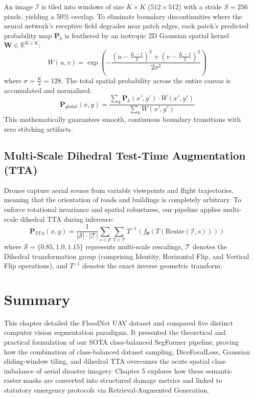 An image $\mathcal{I}$ is tiled into windows of size $K \times K$ ($512 \times 512$) with a stride $S = 256$ pixels, yielding a 50\% overlap. To eliminate boundary discontinuities where the neural network's receptive field degrades near patch edges, each patch's predicted probability map $\mathbf{P}_k$ is feathered by an isotropic 2D Gaussian spatial kernel $\mathbf{W} \in \mathbb{R}^{K \times K}$:
\begin{equation}
    W(u, v) = \exp\left( -\frac{(u - \frac{K-1}{2})^2 + (v - \frac{K-1}{2})^2}{2\sigma^2} \right)
\end{equation}
where $\sigma = \frac{K}{4} = 128$. The total spatial probability across the entire canvas is accumulated and normalized:
\begin{equation}
    \mathbf{P}_{global}(x, y) = \frac{\sum_{k} \mathbf{P}_k(x', y') \cdot W(x', y')}{\sum_{k} W(x', y')}
\end{equation}
This mathematically guarantees smooth, continuous boundary transitions with zero stitching artifacts.

\subsection{Multi-Scale Dihedral Test-Time Augmentation (TTA)}
Drones capture aerial scenes from variable viewpoints and flight trajectories, meaning that the orientation of roads and buildings is completely arbitrary. To enforce rotational invariance and spatial robustness, our pipeline applies multi-scale dihedral TTA during inference:
\begin{equation}
    \mathbf{P}_{TTA}(x, y) = \frac{1}{|\mathcal{S}| \cdot |\mathcal{T}|} \sum_{s \in \mathcal{S}} \sum_{T \in \mathcal{T}} T^{-1}\left( f_{\boldsymbol{\theta}}\left( T(\text{Resize}(\mathcal{I}, s)) \right) \right)
\end{equation}
where $\mathcal{S} = \{0.85, 1.0, 1.15\}$ represents multi-scale rescalings, $\mathcal{T}$ denotes the Dihedral transformation group (comprising Identity, Horizontal Flip, and Vertical Flip operations), and $T^{-1}$ denotes the exact inverse geometric transform.

\section{Summary}
This chapter detailed the FloodNet UAV dataset and compared five distinct computer vision segmentation paradigms. It presented the theoretical and practical formulation of our SOTA class-balanced SegFormer pipeline, proving how the combination of class-balanced dataset sampling, DiceFocalLoss, Gaussian sliding-window tiling, and dihedral TTA overcomes the acute spatial class imbalance of aerial disaster imagery. Chapter 5 explores how these semantic raster masks are converted into structured damage metrics and linked to statutory emergency protocols via Retrieval-Augmented Generation.
